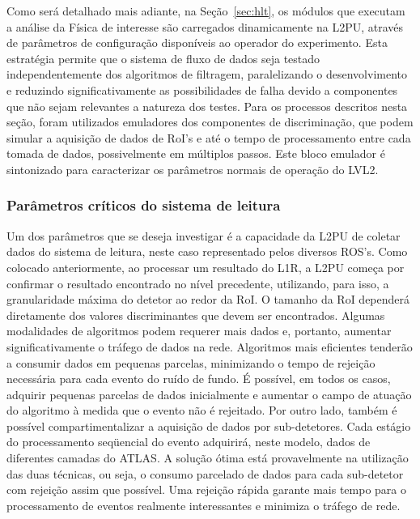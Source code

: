 Como será detalhado mais adiante, na Seção~\ref{sec:hlt}, os módulos que
executam a análise da Física de interesse são carregados dinamicamente na
L2PU, através de parâmetros de configuração disponíveis ao operador do
experimento. Esta estratégia permite que o sistema de fluxo de dados seja
testado independentemente dos algoritmos de filtragem, paralelizando o
desenvolvimento \cite{aa:tns-2004-2} e reduzindo significativamente as
possibilidades de falha devido a componentes que não sejam relevantes a natureza dos
testes. Para os processos descritos nesta seção, foram utilizados emuladores
dos componentes de discriminação, que podem simular a aquisição de dados de
RoI's e até o tempo de processamento entre cada tomada de dados, possivelmente
em múltiplos passos. Este bloco emulador é sintonizado para caracterizar os
parâmetros normais de operação do LVL2.

\subsubsection{Parâmetros críticos do sistema de leitura}

Um dos parâmetros que se deseja investigar é a capacidade da L2PU de coletar
dados do sistema de leitura, neste caso representado pelos diversos
ROS's. Como colocado anteriormente, ao processar um resultado do L1R, a L2PU
começa por confirmar o resultado encontrado no nível precedente, utilizando,
para isso, a granularidade máxima do detetor ao redor da RoI. O tamanho da RoI
dependerá diretamente dos valores discriminantes que devem ser
encontrados. Algumas modalidades de algoritmos podem requerer mais dados e,
portanto, aumentar significativamente o tráfego de dados na rede. Algoritmos
mais eficientes tenderão a consumir dados em pequenas parcelas, minimizando o
tempo de rejeição necessária para cada evento do ruído de fundo. É possível,
em todos os casos, adquirir pequenas parcelas de dados inicialmente e aumentar
o campo de atuação do algoritmo à medida que o evento não é rejeitado. Por
outro lado, também é possível compartimentalizar a aquisição de dados por
sub-detetores. Cada estágio do processamento seqüencial do evento adquirirá,
neste modelo, dados de diferentes camadas do ATLAS. A solução ótima está
provavelmente na utilização das duas técnicas, ou seja, o consumo parcelado de
dados para cada sub-detetor com rejeição assim que possível. Uma rejeição
rápida garante mais tempo para o processamento de eventos realmente
interessantes e minimiza o tráfego de rede.

